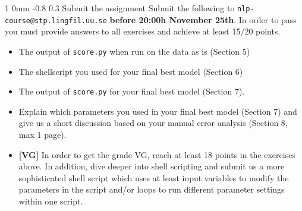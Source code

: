 \documentclass[11pt]{article}
\makeatletter
\newcommand{\newsec}[2]{\section{#1}\label{sec:#2}\noindent}
\renewcommand{\section}{\@startsection
{section}%
{1}%
{0mm}%
{-0.8\baselineskip}%
{0.3\baselineskip}%
{\bfseries\large}}%
\makeatother
\begin{document}
\newsec{Submit the assignment}{submit}%
Submit the following to {\tt nlp-course@stp.lingfil.uu.se}
\textbf{before 20:00h November 25th}. In order to pass you must
provide answers to all exercises and achieve at least 15/20 points.
\begin{itemize}[noitemsep,topsep=0.2cm]
\item The output of {\tt score.py} when run on the data as is (Section 5)
\item The shellscript you used for your final best model (Section 6)
\item The output of {\tt score.py} for your final best model (Section 7).
\item  Explain which parameters you used in your final best model (Section 7)
and give us a short discussion based on your manual error analysis (Section 8, max 1 page).
\item \textbf{[VG]} In order to get the grade VG, reach at least 18
  points in the exercises above. In addition, dive deeper into shell
  scripting and submit us a more sophisticated shell script which uses
  at least input variables to modify the parameters in the script
  and/or loops to run different parameter settings within one script.
\end{itemize}
\end{document}
